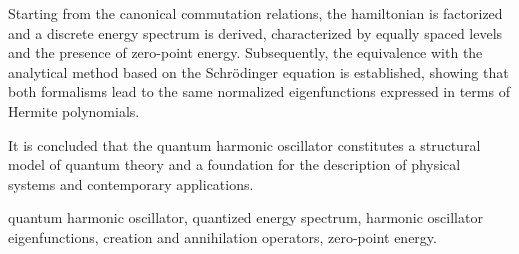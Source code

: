 \documentclass[11pt,a4paper,spanish]{book}
\begin{document}
Starting from the canonical commutation relations, the hamiltonian is factorized and a discrete energy spectrum is derived, characterized by equally spaced levels and the presence of zero-point energy. Subsequently, the equivalence with the analytical method based on the Schrödinger equation is established, showing that both formalisms lead to the same normalized eigenfunctions expressed in terms of Hermite polynomials.

It is concluded that the quantum harmonic oscillator constitutes a structural model of quantum theory and a foundation for the description of physical systems and contemporary applications.

\vspace{1cm}

 quantum harmonic oscillator, quantized energy spectrum, harmonic oscillator eigenfunctions, creation and annihilation operators, zero-point energy.





\mainmatter






{} 


% 
%



\appendix

\end{document}

